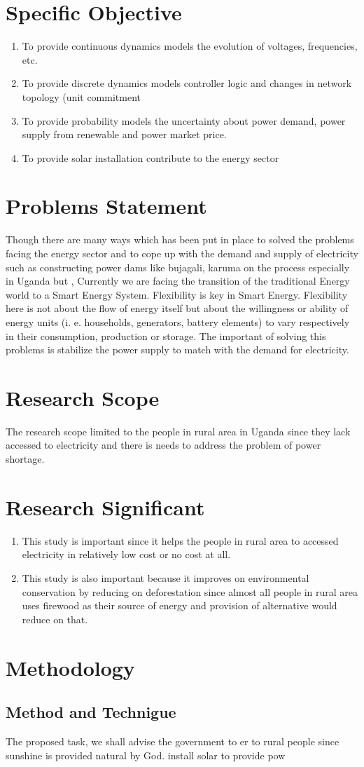 \documentclass[11pt]{article}
\begin{document}
\section{Specific Objective}
\begin{enumerate}
\item 	To provide continuous dynamics models the evolution of voltages, frequencies, etc.
\item 	To provide discrete dynamics models controller logic and changes in network topology (unit commitment
\item 	To provide probability models the uncertainty about power demand, power supply from renewable and power market price.
\item  To provide solar installation contribute to the energy sector
\end{enumerate}

\section{Problems Statement}
Though there are many ways which has been put in place to solved the problems facing the energy sector and to cope up with  the demand and supply of electricity such as constructing power dams like bujagali, karuma  on the process especially in Uganda but , Currently we are facing the transition of the traditional Energy world to a Smart Energy System. Flexibility is key in Smart Energy. Flexibility here is not about the ﬂow of energy itself but about the willingness or ability of energy units (i. e. households, generators, battery elements) to vary respectively in their consumption, production or storage. The important of solving this problems is stabilize the power supply to match with the demand for electricity.  
\section{Research Scope}
The research scope limited to the people in rural area in Uganda since they  lack accessed to electricity and  there is needs to address the problem of power shortage.
\section{Research Significant}
\begin{enumerate}
\item This study is important since it helps the people in rural area to accessed electricity in relatively low cost or no cost at all.
\item  This study is also important because it improves on environmental conservation by reducing on deforestation since almost all people in rural area uses firewood as their source of energy and provision of alternative would reduce on that.
\end{enumerate}
\section{Methodology}
\subsection{Method and Technigue}
The proposed task, we shall advise the government to er to rural people since sunshine is provided natural by God.
\cite{ru}
\cite{di}
\cite{kn}
install solar to provide pow


\end{document}
